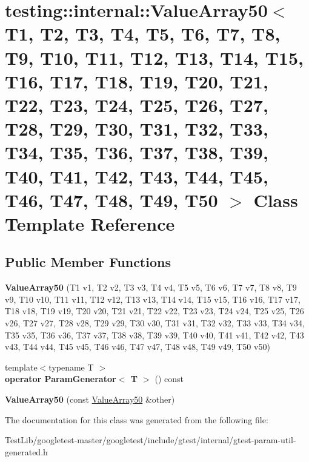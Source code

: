 \hypertarget{classtesting_1_1internal_1_1ValueArray50}{}\section{testing\+:\+:internal\+:\+:Value\+Array50$<$ T1, T2, T3, T4, T5, T6, T7, T8, T9, T10, T11, T12, T13, T14, T15, T16, T17, T18, T19, T20, T21, T22, T23, T24, T25, T26, T27, T28, T29, T30, T31, T32, T33, T34, T35, T36, T37, T38, T39, T40, T41, T42, T43, T44, T45, T46, T47, T48, T49, T50 $>$ Class Template Reference}
\label{classtesting_1_1internal_1_1ValueArray50}
\subsection*{Public Member Functions}
\begin{DoxyCompactItemize}
\item 
\mbox{\label{classtesting_1_1internal_1_1ValueArray50_af48a47a824b188be4674285466bebf4b}} 
{\bfseries Value\+Array50} (T1 v1, T2 v2, T3 v3, T4 v4, T5 v5, T6 v6, T7 v7, T8 v8, T9 v9, T10 v10, T11 v11, T12 v12, T13 v13, T14 v14, T15 v15, T16 v16, T17 v17, T18 v18, T19 v19, T20 v20, T21 v21, T22 v22, T23 v23, T24 v24, T25 v25, T26 v26, T27 v27, T28 v28, T29 v29, T30 v30, T31 v31, T32 v32, T33 v33, T34 v34, T35 v35, T36 v36, T37 v37, T38 v38, T39 v39, T40 v40, T41 v41, T42 v42, T43 v43, T44 v44, T45 v45, T46 v46, T47 v47, T48 v48, T49 v49, T50 v50)
\item 
\mbox{\label{classtesting_1_1internal_1_1ValueArray50_ac78bd46562b55fbf25760e08820865d8}} 
{\footnotesize template$<$typename T $>$ }\\{\bfseries operator Param\+Generator$<$ T $>$} () const
\item 
\mbox{\label{classtesting_1_1internal_1_1ValueArray50_add43e888b3f6efd8f9c1b5829ecd1fd7}} 
{\bfseries Value\+Array50} (const \hyperlink{classtesting_1_1internal_1_1ValueArray50}{Value\+Array50} \&other)
\end{DoxyCompactItemize}


The documentation for this class was generated from the following file\+:\begin{DoxyCompactItemize}
\item 
Test\+Lib/googletest-\/master/googletest/include/gtest/internal/gtest-\/param-\/util-\/generated.\+h\end{DoxyCompactItemize}
